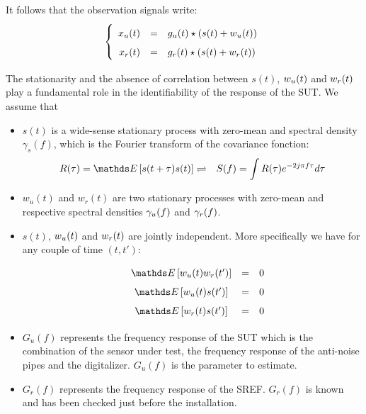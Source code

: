 It follows that the observation signals write:
\begin{eqnarray}
\label{eq:model-of-obervation}
\left\{
\renewcommand\arraystretch{1.6}
\begin{array}{rcl}
x_{\ut}(t)&=&g_{\ut} (t)\star(s(t)+w_{\ut}(t))
\\
x_{\rf}(t)&=&g_{\rf}(t) \star (s(t)+w_{\rf}(t))
\end{array}
\right.
\end{eqnarray}

The stationarity and the absence of correlation between $s(t)$, $w_{{u}}(t)$ and $w_{{r}}(t)$ play a fundamental  role in the identifiability of the response of the SUT. We assume that
\begin{itemize}
\item
$s(t)$ is a wide-sense stationary process with zero-mean and spectral density $\gamma_{s}(f)$,
which is the Fourier transform of the covariance fonction:
\begin{eqnarray*}
 R(\tau) = \esp{s(t+\tau)s(t)}&\rightleftharpoons  &
 S(f)=\int R(\tau) e^{-2j\pi f\tau}d\tau
\end{eqnarray*}
\item
$w_{u}(t)$ and $w_{r}(t)$ are two  stationary processes with zero-mean and respective spectral densities $\gamma_{{u}}(f)$ and $\gamma_{{r}}(f)$. 
\item
$s(t)$,  $w_{{u}}(t)$ and $w_{{r}}(t)$ are jointly independent. More specifically we have for any couple of time $(t,t')$:
\begin{eqnarray*}
\begin{array}{lccr}
 &\esp{w_{\ut}(t)w_{r}(t')}&=&0
 \\
& \esp{w_{\ut}(t)s(t')}&=&0
 \\
& \esp{w_{\rf}(t)s(t')}&=&0
\end{array}
 \end{eqnarray*}
\item
$G_{u}(f)$ represents the frequency response of the SUT which is the combination of the sensor under test, the frequency response of the anti-noise pipes and the digitalizer. $G_{u}(f)$ is the parameter to estimate.
\item
$G_{r}(f)$ represents the frequency response of the SREF. $G_{r}(f)$ is known and has been checked just before the installation.
\end{itemize}

